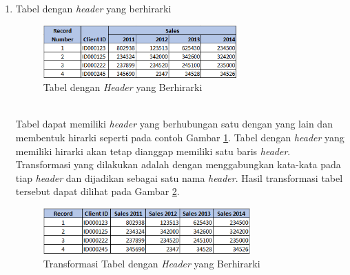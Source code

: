 \begin{enumerate}
	\item Tabel dengan \textit{header} yang berhirarki
	\begin{figure}[htbp]
	    \centering
	    \includegraphics[width=0.7\textwidth]{resources/chapter-3-tabletype-3.png}
	    \caption{Tabel dengan \textit{Header} yang Berhirarki}
		\label{TabelTipe3}
	\end{figure}\\
	Tabel dapat memiliki \textit{header} yang berhubungan satu dengan yang lain dan membentuk hirarki seperti pada contoh Gambar \ref{TabelTipe3}. Tabel dengan \textit{header} yang memiliki hirarki akan tetap dianggap memiliki satu baris \textit{header}. Transformasi yang dilakukan adalah dengan menggabungkan kata-kata pada tiap \textit{header} dan dijadikan sebagai satu nama \textit{header}. Hasil transformasi tabel tersebut dapat dilihat pada Gambar \ref{TabelTipe3T}.\\
	\begin{figure}[htbp]
	    \centering
	    \includegraphics[width=0.75\textwidth]{resources/chapter-3-tabletype-3-transformed.png}
	    \caption{Transformasi Tabel dengan \textit{Header} yang Berhirarki}
		\label{TabelTipe3T}
	\end{figure}


\end{enumerate}
